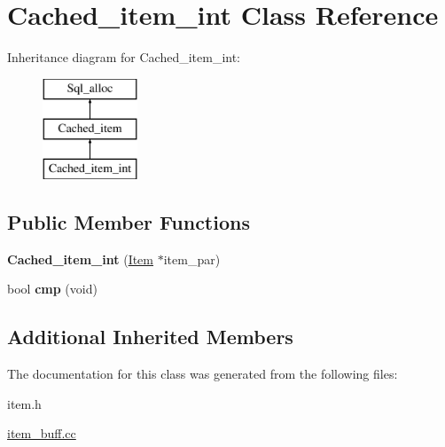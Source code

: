 \hypertarget{classCached__item__int}{}\section{Cached\+\_\+item\+\_\+int Class Reference}
\label{classCached__item__int}
Inheritance diagram for Cached\+\_\+item\+\_\+int\+:\begin{figure}[H]
\begin{center}
\leavevmode
\includegraphics[height=3.000000cm]{classCached__item__int}
\end{center}
\end{figure}
\subsection*{Public Member Functions}
\begin{DoxyCompactItemize}
\item 
\mbox{\label{classCached__item__int_aedf208e0160c94f9b0420dbe0b496f9d}} 
{\bfseries Cached\+\_\+item\+\_\+int} (\mbox{\hyperlink{classItem}{Item}} $\ast$item\+\_\+par)
\item 
\mbox{\label{classCached__item__int_ab0dcc1278c74690d064067ee3c3437c0}} 
bool {\bfseries cmp} (void)
\end{DoxyCompactItemize}
\subsection*{Additional Inherited Members}


The documentation for this class was generated from the following files\+:\begin{DoxyCompactItemize}
\item 
item.\+h\item 
\mbox{\hyperlink{item__buff_8cc}{item\+\_\+buff.\+cc}}\end{DoxyCompactItemize}
